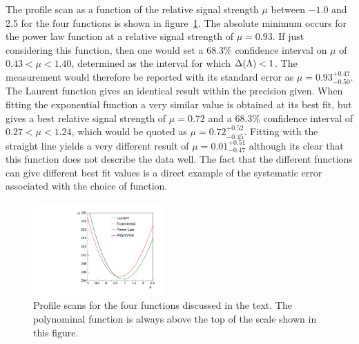 The profile scan as a function of the relative signal strength $\mu$
between $-1.0$ and 2.5
for the four functions is shown in
figure~\ref{fig:functions:profiles}.
The absolute minimum occurs for the power law function at a relative signal 
strength of $\mu = 0.93$. If just considering this function,
then one would set a 68.3\% confidence interval on $\mu$ of  
$0.43 < \mu < 1.40 $, determined as the interval for which $\Delta({\rm \Lambda}) < 1$. 
The measurement would therefore be reported with its standard error as $\mu=0.93^{+0.47}_{-0.50}$. The Laurent function gives an identical result within the precision given.
When fitting the exponential function a very similar \nll value is obtained
at its best fit, but gives a best relative signal strength of $\mu = 0.72$
and a 68.3\% confidence interval of
$0.27 < \mu < 1.24 $, which would be quoted as $\mu = 0.72^{+0.52}_{-0.45}$.
Fitting with the straight line yields a very different result of 
$\mu = 0.01^{+0.51}_{-0.47}$ 
although its clear that this function does not describe the data well.
The fact that the different functions can give different best fit values
is a direct example of the systematic error associated
with the choice of function.
%
\begin{figure}[tbp]
\centering
\includegraphics[width=0.45\textwidth]{functions/Profiles.pdf}
\caption{Profile \nll scans for the four functions discussed in the text.
The polynominal function is always above the top of the \nll scale shown in this
figure. }
\label{fig:functions:profiles}
\end{figure}

